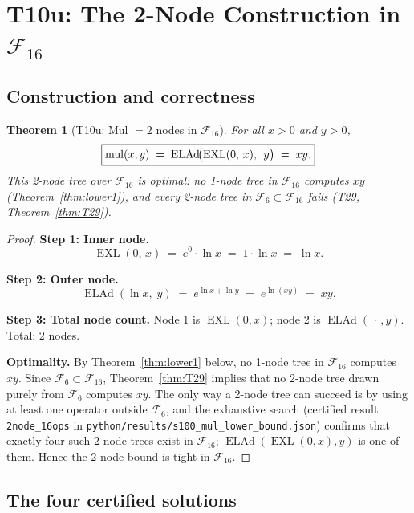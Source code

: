 \documentclass[12pt,a4paper]{article}
\newtheorem{theorem}{Theorem}[section]
\theoremstyle{definition}
\newcommand{\EXL}{\operatorname{EXL}}
\newcommand{\ELAd}{\operatorname{ELAd}}
\newcommand{\mul}{\operatorname{mul}}
\begin{document}
\section{T10u: The 2-Node Construction in $\mathcal{F}_{16}$}

\subsection{Construction and correctness}

\begin{theorem}[T10u: Mul $= 2$ nodes in $\mathcal{F}_{16}$]\label{thm:T10u}
For all $x>0$ and $y>0$,
\[
  \boxed{%
    \mul(x,y) \;=\; \ELAd\!\bigl(\EXL(0,\,x),\;\,y\bigr) \;=\; xy.
  }
\]
This 2-node tree over $\mathcal{F}_{16}$ is \emph{optimal}: no 1-node tree
in $\mathcal{F}_{16}$ computes $xy$ (Theorem~\ref{thm:lower1}), and every
2-node tree in $\mathcal{F}_6\subset\mathcal{F}_{16}$ fails (T29,
Theorem~\ref{thm:T29}).
\end{theorem}

\begin{proof}
\noindent\textbf{Step 1: Inner node.}
\[
  \EXL(0,\,x) \;=\; e^{0}\cdot\ln x \;=\; 1\cdot\ln x \;=\; \ln x.
\]

\noindent\textbf{Step 2: Outer node.}
\[
  \ELAd(\ln x,\;y) \;=\; e^{\ln x + \ln y} \;=\; e^{\ln(xy)} \;=\; xy.
\]

\noindent\textbf{Step 3: Total node count.}
Node 1 is $\EXL(0,x)$; node 2 is $\ELAd(\,\cdot\,,y)$.  Total: 2 nodes.

\noindent\textbf{Optimality.}
By Theorem~\ref{thm:lower1} below, no 1-node tree in $\mathcal{F}_{16}$
computes $xy$.  Since $\mathcal{F}_6\subset\mathcal{F}_{16}$, Theorem~\ref{thm:T29}
implies that no 2-node tree drawn purely from $\mathcal{F}_6$ computes $xy$.
The only way a 2-node tree can succeed is by using at least one operator
outside $\mathcal{F}_6$, and the exhaustive search (certified result
\texttt{2node\_16ops} in
\texttt{python/results/s100\_mul\_lower\_bound.json}) confirms that exactly
four such 2-node trees exist in $\mathcal{F}_{16}$; $\ELAd(\EXL(0,x),y)$ is
one of them.  Hence the 2-node bound is tight in $\mathcal{F}_{16}$.
\end{proof}

\subsection{The four certified solutions}
\end{document}
